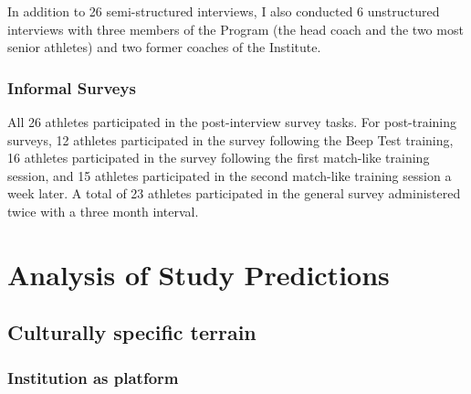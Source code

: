In addition to 26 semi-structured interviews, I also conducted 6 unstructured interviews with three members of the Program (the head coach and the two most senior athletes) and two former coaches of the Institute.

\subsubsection{Informal Surveys}
All 26 athletes participated in the post-interview survey tasks.  For post-training surveys, 12 athletes participated in the survey following the Beep Test training, 16 athletes participated in the survey following the first match-like training session, and 15 athletes participated in the second match-like training session a week later.  A total of 23 athletes participated in the general survey administered twice with a three month interval.










\section{Analysis of Study Predictions}


  \subsection{Culturally specific terrain}

    \subsubsection{Institution as platform}



